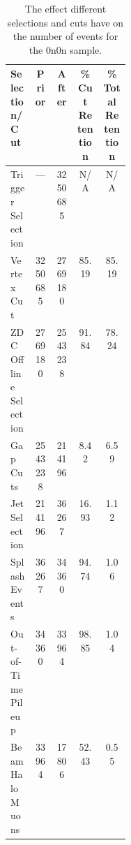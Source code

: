 \begin{table}[]\label{tab:0n0n_events}
\centering
\begin{threeparttable}
\begin{tabular}{ p{0.2\linewidth} c c c c }
\toprule
\textbf{Selection/Cut} & \textbf{Prior} & \textbf{After} & \textbf{\% Cut Retention} & \textbf{\% Total Retention}\\
\toprule
Trigger Selection & --- & 3250685 & N/A & N/A\\
\hline
Vertex Cut & 3250685 & 2769180 & 85.19 & 85.19\\
\hline
ZDC Offline Selection & 2769180 & 2543238 & 91.84 & 78.24\\
\hline
Gap Cuts & 2543238 & 214196 & 8.42 & 6.59\\
\hline
Jet Selection & 214196 & 36267 & 16.93 & 1.12\\
\hline
Splash Events & 36267 & 34360 & 94.74 & 1.06\\
\hline
Out-of-Time Pileup & 34360 & 33964 & 98.85 & 1.04\\
\hline
Beam Halo Muons & 33964 & 17806 & 52.43 & 0.55\\
\bottomrule
\end{tabular}
\end{threeparttable}
\caption{The effect different selections and cuts have on the number of events for the 0n0n sample.}
\label{tab:0n0n_cutTable}
\end{table}